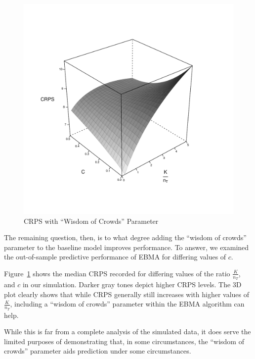 \documentclass[12pt,fullpage,endnotes]{article}
\begin{document}

\begin{figure}[ht]
\caption{CRPS with ``Wisdom of Crowds'' Parameter}
\label{3d}
\centering
\includegraphics[scale=.6]{3D}
\end{figure}

The remaining question, then, is to what degree adding the ``wisdom of
crowds'' parameter to the baseline model improves performance.  To
answer, we examined the out-of-sample predictive performance of EBMA
for differing values of $c$. 



Figure~\ref{3d} shows the median CRPS recorded for differing values of the ratio $\frac{K}{n_T}$, and $c$ in our simulation. Darker gray tones depict higher CRPS levels. The 3D plot clearly shows that while CRPS generally still increases with higher values of $\frac{K}{n_T}$, including a ``wisdom of crowds'' parameter within the EBMA algorithm can help. 

While this is far from a complete analysis of the simulated data, it
does serve the limited purposes of demonstrating that, in some
circumstances, the ``wisdom of crowds'' parameter aids prediction
under some circumstances.
\end{document}
